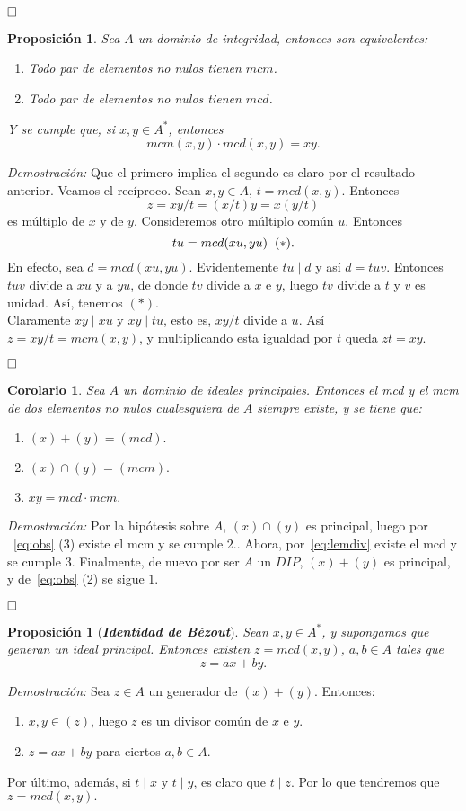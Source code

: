 \documentclass[12pt]{article}
\newtheorem{proposition}[theorem]{Proposición}
\newtheorem{corolario}{Corolario}[theorem]
\begin{document}
$\hfill \square$

\begin{proposition} \label{eq:mcmd} Sea $A$ un dominio de integridad, entonces son equivalentes:
\begin{enumerate}
\item Todo par de elementos no nulos tienen $mcm$.
\item Todo par de elementos no nulos tienen $mcd$.
\end{enumerate}
Y se cumple que, si $x,y \in A^{\ast}$, entonces $$mcm(x,y) \cdot mcd(x,y) = xy.$$
\end{proposition}
\emph{Demostración: } Que el primero implica el segundo es claro por el resultado anterior. Veamos el recíproco. Sean $x,y \in A$, $t = mcd(x,y)$. Entonces $$z = xy/t = (x/t)y = x(y/t)$$ es múltiplo de $x$ y de $y$. Consideremos otro múltiplo común $u$. Entonces $$tu = mcd(xu,yu) \hspace{0.2cm} (\ast).$$ En efecto, sea $d = mcd(xu,yu)$. Evidentemente $tu \mid d$ y así $d = tuv$. Entonces $tuv$ divide a $xu$ y a $yu$, de donde $tv$ divide a $x$ e $y$, luego $tv$ divide a $t$ y $v$ es unidad. Así, tenemos $(\ast)$.\vspace{0.2cm}\\
Claramente $xy \mid xu$ y $xy \mid tu$, esto es, $xy / t$ divide a $u$. Así $z = xy/t = mcm(x,y)$, y multiplicando esta igualdad por $t$ queda $zt = xy$.

$\hfill \square$

\begin{corolario} Sea $A$ un dominio de ideales principales. Entonces el mcd y el mcm de dos elementos no nulos cualesquiera de $A$ siempre existe, y se tiene que: \begin{enumerate}
\item $(x) + (y) = (mcd).$
\item $(x) \cap (y) = (mcm).$
\item $xy = mcd \cdot mcm.$
\end{enumerate}
\end{corolario}
\emph{Demostración: }Por la hipótesis sobre $A$, $(x) \cap (y)$ es principal, luego por ~\ref{eq:obs} (3) existe el mcm y se cumple $2.$. Ahora, por~\ref{eq:lemdiv} existe el mcd y se cumple $3.$ Finalmente, de nuevo por ser $A$ un $DIP$, $(x) + (y)$ es principal, y de~\ref{eq:obs} (2) se sigue $1.$

$\hfill \square$

\begin{proposition}[\textbf{\textit{Identidad de Bézout}}] Sean $x, y \in A^{\ast}$, y supongamos que generan un ideal principal. Entonces existen $z = mcd(x,y)$, $a,b \in A$ tales que $$z = ax + by.$$
\end{proposition}
\emph{Demostración: }Sea $z \in A$ un generador de $(x) + (y)$. Entonces: \begin{enumerate}
\item $x,y \in (z)$, luego $z$ es un divisor común de $x$ e $y$.
\item $z = ax + by$ para ciertos $a,b \in A$.
\end{enumerate}
Por último, además, si $t \mid x$ y $t \mid y$, es claro que $t \mid z$. Por lo que tendremos que $z = mcd(x,y).$
\end{document}
